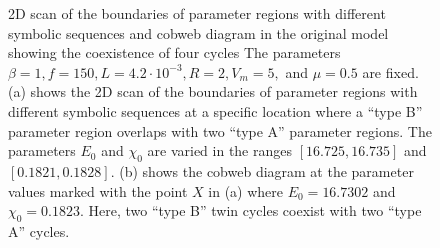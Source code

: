 \begin{figure}
	\centering
	\caption[2D scan of the boundaries of parameter regions with different symbolic sequences and cobweb diagram in the original model showing the coexistence of four cycles]{
		2D scan of the boundaries of parameter regions with different symbolic sequences and cobweb diagram in the original model showing the coexistence of four cycles
		The parameters $\beta = 1, f = 150, L = 4.2 \cdot 10^{-3}, R = 2, V_m = 5,$ and $\mu = 0.5$ are fixed.
		(a) shows the 2D scan of the boundaries of parameter regions with different symbolic sequences at a specific location where a ``type B'' parameter region overlaps with two ``type A'' parameter regions.
		The parameters $E_0$ and $\chi_0$ are varied in the ranges $[16.725, 16.735]$ and $[0.1821, 0.1828]$.
		(b) shows the cobweb diagram at the parameter values marked with the point $X$ in (a) where $E_0 = 16.7302$ and $\chi_0 = 0.1823$.
		Here, two ``type B'' twin cycles coexist with two ``type A'' cycles.
	}
\end{figure}
